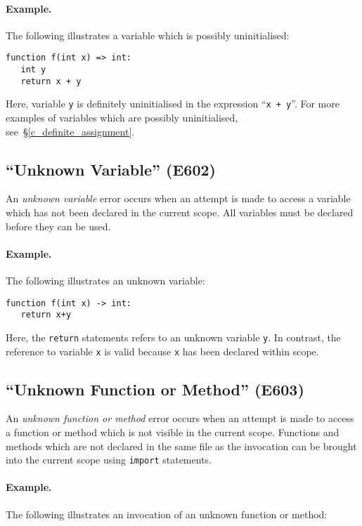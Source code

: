 \paragraph{Example.}  The following illustrates a variable which is possibly uninitialised:

\begin{lstlisting}
function f(int x) => int:
   int y
   return x + y
\end{lstlisting}

Here, variable \lstinline{y} is definitely uninitialised in the expression ``\lstinline{x + y}''.  For more examples of variables which are possibly uninitialised, see~\S\ref{c_definite_assignment}.

\subsection{``Unknown Variable'' (E602)}

An {\em unknown variable} error occurs when an attempt is made to access a variable which has not been declared in the current scope.  All variables must be declared before they can be used.

\paragraph{Example.}  The following illustrates an unknown variable:

\begin{lstlisting}
function f(int x) -> int:
   return x+y
\end{lstlisting}

Here, the \lstinline{return} statements refers to an unknown variable \lstinline{y}.  In contrast, the reference to variable \lstinline{x} is valid because \lstinline{x} has been declared within scope.

\subsection{``Unknown Function or Method'' (E603)}

An {\em unknown function or method} error occurs when an attempt is made to access a function or method which is not visible in the current scope.  Functions and methods which are not declared in the same file as the invocation can be brought into the current scope using \lstinline{import} statements.  
\paragraph{Example.}  The following illustrates an invocation of an unknown function or method:

